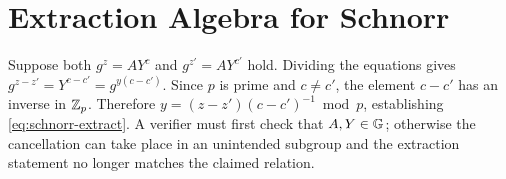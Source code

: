 \section{Extraction Algebra for Schnorr}
\label{app:schnorr}

Suppose both $g^z=AY^c$ and $g^{z'}=AY^{c'}$ hold.  Dividing the equations gives
$g^{z-z'}=Y^{c-c'}=g^{y(c-c')}$.  Since $p$ is prime and $c\ne c'$, the element
$c-c'$ has an inverse in $\mathbb{Z}_p$.  Therefore
$y=(z-z')(c-c')^{-1}\bmod p$, establishing \cref{eq:schnorr-extract}.  A
verifier must first check that $A,Y\in\mathbb{G}$; otherwise the cancellation can take
place in an unintended subgroup and the extraction statement no longer
matches the claimed relation.
